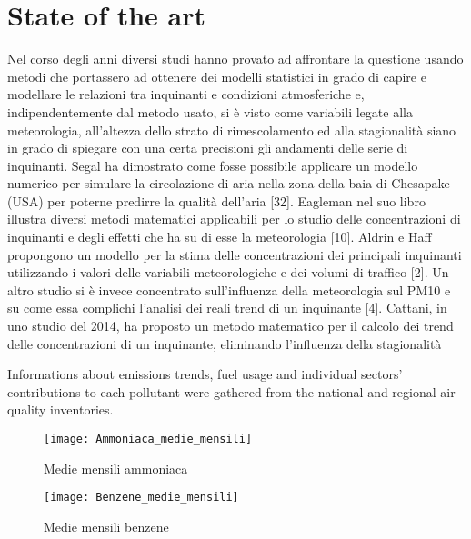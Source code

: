 \section{State of the art}

Nel corso degli anni diversi studi hanno provato ad affrontare la questione usando metodi che portassero ad ottenere dei modelli statistici in grado di capire e modellare le relazioni tra inquinanti e condizioni atmosferiche e, indipendentemente dal metodo usato, si è visto come variabili legate alla meteorologia, all’altezza dello strato di rimescolamento ed alla stagionalità siano in grado di spiegare con una certa precisioni gli andamenti delle serie di inquinanti. Segal ha dimostrato come fosse possibile applicare un modello numerico per simulare la circolazione di aria nella zona della baia di Chesapake (USA) per poterne predirre la qualità dell’aria [32]. Eagleman nel suo libro illustra diversi metodi matematici applicabili per lo studio delle concentrazioni di inquinanti e degli effetti che ha su di esse la meteorologia [10]. Aldrin e Haff propongono un modello per la stima delle concentrazioni dei principali inquinanti utilizzando i valori delle variabili meteorologiche e dei volumi di traffico [2]. Un altro studio si è invece concentrato sull’influenza della meteorologia sul PM10 e su come essa complichi l’analisi dei reali trend di un inquinante [4]. Cattani, in uno studio del 2014, ha proposto un metodo matematico per il calcolo dei trend delle concentrazioni di un inquinante, eliminando l’influenza della stagionalità 


Informations about emissions trends, fuel usage and individual sectors' contributions to each pollutant were gathered from the national and regional air quality inventories. \cite{iir2020, inemar2017}

\begin{figure}
\centering
\texttt{[image: Ammoniaca\_medie\_mensili]}
\caption{Medie mensili ammoniaca}
\label{fig:ammoniaca_medie_mensili_reali}
\end{figure}


\begin{figure}
\centering
\texttt{[image: Benzene\_medie\_mensili]}
\caption{Medie mensili benzene}
\label{fig:benzene_medie_mensili_reali}
\end{figure}

